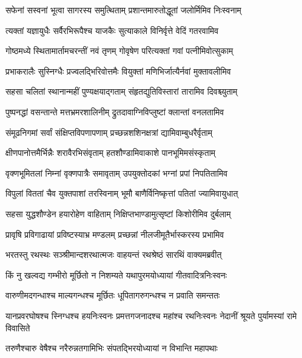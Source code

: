 \twolineshloka
{सफेनां सस्वनां भूत्वा सागरस्य समुत्थिताम्}
{प्रशान्तमारुतोद्धूतां जलोर्मिमिव निःस्वनाम्} %

\twolineshloka
{त्यक्तां यज्ञायुधैः सर्वैरभिरूपैश्च याजकैः}
{सुत्याकाले विनिर्वृत्ते वेदिं गतरवामिव} %

\twolineshloka
{गोष्ठमध्ये स्थितामार्तामचरन्तीं नवं तृणम्}
{गोवृषेण परित्यक्तां गवां पत्नीमिवोत्सुकाम्} %

\twolineshloka
{प्रभाकरालैः सुस्निग्धैः प्रज्वलद्भिरिवोत्तमैः}
{वियुक्तां मणिभिर्जात्यैर्नवां मुक्तावलीमिव} %

\twolineshloka
{सहसा चलितां स्थानान्महीं पुण्यक्षयाद्गताम्}
{संहृतद्युतिविस्तारां तारामिव दिवश्च्युताम्} %

\twolineshloka
{पुष्पनद्धां वसन्तान्ते मत्तभ्रमरशालिनीम्}
{द्रुतदावाग्निविप्लुष्टां क्लान्तां वनलतामिव} %

\twolineshloka
{संमूढनिगमां सर्वां संक्षिप्तविपणापणाम्}
{प्रच्छन्नशशिनक्षत्रां द्यामिवाम्बुधरैर्वृताम्} %

\twolineshloka
{क्षीणपानोत्तमैर्भिन्नैः शरावैरभिसंवृताम्}
{हतशौण्डामिवाकाशे पानभूमिमसंस्कृताम्} %

\twolineshloka
{वृक्णभूमितलां निम्नां वृक्णपात्रैः समावृताम्}
{उपयुक्तोदकां भग्नां प्रपां निपतितामिव} %

\twolineshloka
{विपुलां विततां चैव युक्तपाशां तरस्विनाम्}
{भूमौ बाणैर्विनिष्कृत्तां पतितां ज्यामिवायुधात्} %

\twolineshloka
{सहसा युद्धशौण्डेन हयारोहेण वाहिताम्}
{निक्षिप्तभाण्डामुत्सृष्टां किशोरीमिव दुर्बलाम्} %

\twolineshloka
{प्रावृषि प्रविगाढायां प्रविष्टस्याभ्र मण्डलम्}
{प्रच्छन्नां नीलजीमूतैर्भास्करस्य प्रभामिव} %

\twolineshloka
{भरतस्तु रथस्थः सञ्श्रीमान्दशरथात्मजः}
{वाहयन्तं रथश्रेष्ठं सारथिं वाक्यमब्रवीत्} %

\twolineshloka
{किं नु खल्वद्य गम्भीरो मूर्छितो न निशम्यते}
{यथापुरमयोध्यायां गीतवादित्रनिःस्वनः} %

\twolineshloka
{वारुणीमदगन्धाश्च माल्यगन्धश्च मूर्छितः}
{धूपितागरुगन्धश्च न प्रवाति समन्ततः} %

\threelineshloka
{यानप्रवरघोषश्च स्निग्धश्च हयनिःस्वनः}
{प्रमत्तगजनादश्च महांश्च रथनिःस्वनः}
{नेदानीं श्रूयते पुर्यामस्यां रामे विवासिते} %

\twolineshloka
{तरुणैश्चारु वेषैश्च नरैरुन्नतगामिभिः}
{संपतद्भिरयोध्यायां न विभान्ति महापथाः} %

